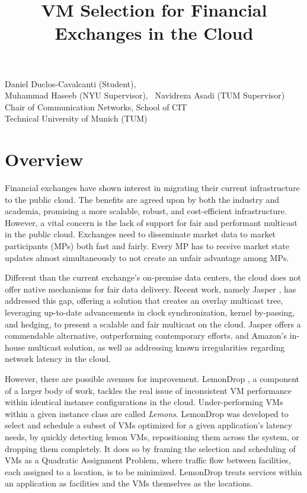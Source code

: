 \documentclass{article}
\title{VM Selection for Financial Exchanges in the Cloud}
\makeatletter
\renewcommand{\maketitle}{%
    \thispagestyle{fancy}%
    \begin{center}
        \Large\bfseries\@title
    \end{center}
    \vspace{-0.25cm}
    \begin{center}
        Daniel Duclos-Cavalcanti (Student),
        \\
        Muhammad Haseeb (NYU Supervisor),
        ~Navidreza Asadi (TUM Supervisor) 
        \\Chair of Communication Networks, School of CIT
        \\Technical University of Munich (TUM)
    \end{center}
}
\makeatother
\begin{document}
\maketitle

\section{Overview}

Financial exchanges have shown interest in migrating their current infrastructure 
to the public cloud. The benefits are agreed upon by both the industry and 
academia, promising a more scalable, robust, and cost-efficient infrastructure. 
However, a vital concern is the lack of support for fair and performant multicast 
in the public cloud. Exchanges need to disseminate market data to market participants 
(MPs) both fast and fairly. Every MP has to receive market state updates 
almost simultaneously to not create an unfair advantage among MPs.

Different than the current exchange's on-premise data centers, the cloud does not 
offer native mechanisms for fair data delivery. Recent work, namely Jasper \cite{haseeb2024jasper}, 
has addressed this gap, offering a solution that creates an overlay multicast tree, leveraging 
up-to-date advancements in clock synchronization, kernel by-passing, and hedging, 
to present a scalable and fair multicast on the cloud. Jasper offers a commendable 
alternative, outperforming contemporary efforts, and Amazon's in-house multicast solution, 
as well as addressing known irregularities regarding network latency in the cloud.

However, there are possible avenues for improvement. LemonDrop \cite{sachidananda2022scheduling}, a component 
of a larger body of work, tackles the real issue of inconsistent VM performance within identical instance configurations 
in the cloud. Under-performing VMs within a given instance class are called \textit{Lemons}. 
LemonDrop was developed to select and schedule a subset of VMs optimized for a given application's latency needs, by quickly 
detecting lemon VMs, repositioning them across the system, or dropping them completely.
It does so by framing the selection and scheduling of VMs as a Quadratic Assignment Problem, where 
traffic flow between facilities, each assigned to a location, is to be minimized.
LemonDrop treats services within an application as facilities and the VMs themselves as the locations. 

\end{document}
